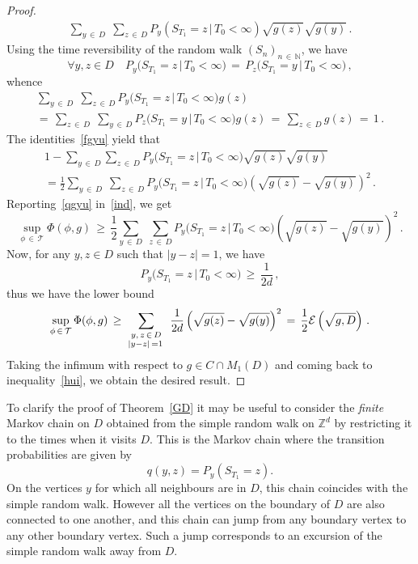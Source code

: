\documentclass[AHL, Unicode, longabstracts, published]{cedram}
\newcommand{\tatop}[2]{\genfrac{}{}{0pt}{1}{#1}{#2}}
\newcommand*\N {{\mathbb N}}
\newcommand*\T{\mathcal{T}}
\newcommand{\cE}{\mathcal{E}}
\renewcommand{\N}{\mathbb{N}}
\let\oldforall\forall
\renewcommand*{\forall}{\mathrel{\oldforall}}
\begin{document}
\begin{proof}
\begin{multline}
\sum_{y\,\in\,D}\;
\sum_{z\,\in\,D} P_y\left(S_{T_1}=z \,\big|\,T_0<\infty\right)
\sqrt{ g(z) } { \sqrt{g(y)}}
\,.
\end{multline}
Using the time reversibility of the random walk $(S_n)_{n\,\in\,\N}$, we have
\begin{equation}\label{wgyu}
\forall y,z\in D\quad P_y\big(S_{T_1}=z \,\big|\,T_0<\infty\big)
\,=\, P_z\big(S_{T_1}=y \,\big|\,T_0<\infty\big)
\,,
\end{equation}
whence
\begin{multline}\label{fgyu}
\sum_{y\,\in\,D}\;
\sum_{z\,\in\,D} P_y\big(S_{T_1}=z \,\big|\,T_0<\infty\big) g(z) \\
=\,\sum_{z\,\in\,D}\;
\sum_{y\,\in\,D} P_z\big(S_{T_1}=y \,\big|\,T_0<\infty\big) g(z)
\,=\,
\sum_{z\,\in\,D} g(z)
\,=\,1\,.
\end{multline}
The identities~\eqref{fgyu} yield that
\begin{multline}\label{qgyu}
1 -
\sum_{y\,\in\,D}
\sum_{z\,\in\,D} P_y\big(S_{T_1}=z \,\big|\,T_0<\infty\big)
\sqrt{ g(z) } { \sqrt{g(y)}}\\
=\frac{1}{2}
\sum_{y\,\in\,D}\;
\sum_{z\,\in\,D} P_y\big(S_{T_1}=z \,\big|\,T_0<\infty\big)
\left(\sqrt{ g(z) }- { \sqrt{g(y)}}\right)^2\,.
\end{multline}
Reporting~\eqref{qgyu} in~\eqref{ind}, we get
\begin{equation}\label{wqx}
{\sup_{\phi\,\in\,\T} \Phi(\phi,g)}
\,\geq\,
\frac{1}{2}
\sum_{y\,\in\,D}\;
\sum_{z\,\in\,D} P_y\big(S_{T_1}=z \,\big|\,T_0<\infty\big)
\left(\sqrt{ g(z) }- { \sqrt{g(y)}}\right)^2\,.
\end{equation}
Now, for any $y,z\in D$ such that ${|y-z|=1}$, we have
\[
P_y\big(S_{T_1}=z \,\big|\,T_0<\infty\big)
\,\geq\, \frac{1}{2d}\,,
\]
thus we have the lower bound
\begin{equation}\label{ine}
{\sup_{\phi\,\in\,\T} \Phi(\phi,g)}
\,\geq\,
\sum_{\tatop{y,\,z\,\in\,D}{|y-z|\,=1\,}}\:
\frac{1}{2d}
\left(\sqrt{ g(z) }- {\sqrt{g(y)}}\right)^2
\,=\,\frac{1}{2}\cE\left(\sqrt{g,D}\right)
\,.
\end{equation}
Taking the infimum with respect to ${g\in C\cap M_1(D) }$ and coming back to inequality~\eqref{hui}, we obtain the desired result.
\end{proof}

To clarify the proof of Theorem~\ref{GD} it may be useful to consider the \emph{finite} Markov chain on $D$ obtained from the simple random walk on $\mathbb{Z}^d$ by restricting it to the times when it visits $D$. This is the Markov chain where the transition probabilities are given by
\[
q(y,z) = P_y(S_{T_1} = z).
\]
On the vertices $y$ for which all neighbours are in $D$, this chain coincides with the simple random walk. However all the vertices on the boundary of $D$ are also connected to one another, and this chain can jump from any boundary vertex to any other boundary vertex. Such a jump corresponds to an excursion of the simple random walk away from $D$.
\end{document}

